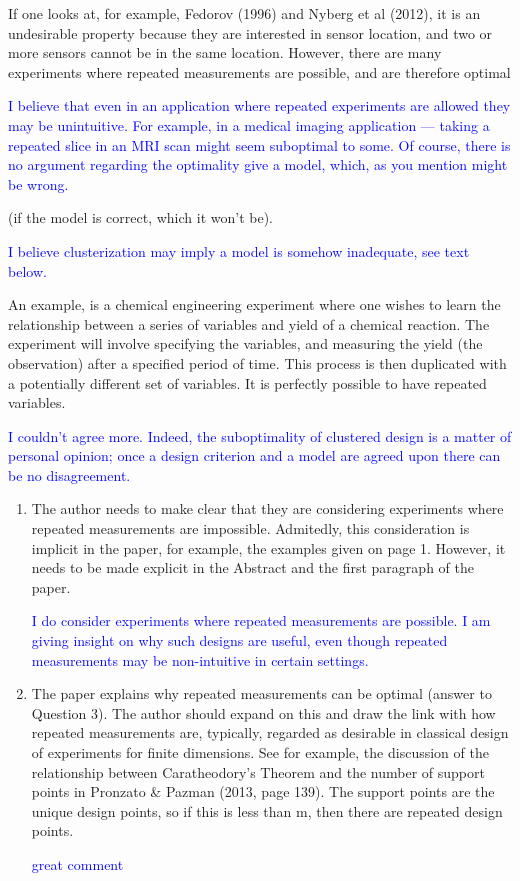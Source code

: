 \documentclass{amsart}
\newcommand{\answer}[1]{\vskip 0.05in \textcolor{blue}{#1} \vskip 0.05in}
\begin{document}
If one looks at, for example, Fedorov (1996) and Nyberg et
al (2012), it is an undesirable property because they are interested
in sensor location, and two or more sensors cannot be in the same
location. However, there are many experiments where repeated
measurements are possible, and are therefore optimal

\answer{I believe that even in an application where repeated
experiments are allowed they may be unintuitive. For example, in a
medical imaging application --- taking a repeated slice in an MRI scan
might seem suboptimal to some. Of course, there is no argument
regarding the optimality give a model, which, as you mention might be
wrong.}


(if the model is correct, which it won’t be).

\answer{I believe clusterization may imply a model is somehow
  inadequate, see text below. }


An example, is a chemical engineering experiment
where one wishes to learn the relationship between a series of
variables and yield of a chemical reaction. The experiment will
involve specifying the variables, and measuring the yield (the
observation) after a specified period of time. This process is then
duplicated with a potentially different set of variables.  It is
perfectly possible to have repeated variables.

\answer{I couldn't agree more. Indeed, the suboptimality of clustered
design is a matter of personal opinion; once a design criterion and a
model are agreed upon there can be no disagreement.}

\begin{enumerate}
 
\item The author needs to make clear that they are considering
  experiments where repeated measurements are impossible. Admitedly,
  this consideration is implicit in the paper, for example, the
  examples given on page 1. However, it needs to be made explicit in
  the Abstract and the first paragraph of the paper.

  \answer{I do consider experiments where repeated measurements are
  possible. I am giving insight on why such designs are useful, even
  though repeated measurements may be non-intuitive in certain
  settings.}
  
\item The paper explains why repeated measurements can be optimal
  (answer to Question 3). The author should expand on this and draw
  the link with how repeated measurements are, typically, regarded as
  desirable in classical design of experiments for finite
  dimensions. See for example, the discussion of the relationship
  between Caratheodory’s Theorem and the number of support points in
  Pronzato \& Pazman (2013, page 139). The support points are the
  unique design points, so if this is less than m, then there are
  repeated design points.

  \answer{great comment}
\end{enumerate}
\end{document}
